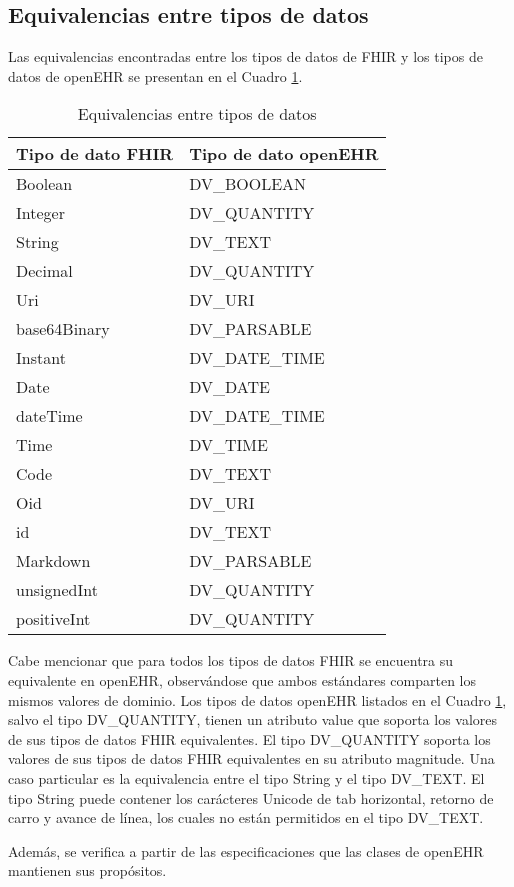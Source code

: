 \subsection{Equivalencias entre tipos de datos}

Las equivalencias encontradas entre los tipos de datos de FHIR y los tipos de datos de openEHR se presentan en el Cuadro \ref{table:equivalents}.

\begin{table}[h]
  \caption{Equivalencias entre tipos de datos}
  \label{table:equivalents}
  \begin{tabular}{l l}
    \hline
    Tipo de dato FHIR &	Tipo de dato openEHR \\
    \hline
    Boolean	& DV\_BOOLEAN \\
    Integer	& DV\_QUANTITY \\
    String	& DV\_TEXT \\
    Decimal	& DV\_QUANTITY \\
    Uri	& DV\_URI \\
    base64Binary	& DV\_PARSABLE \\
    Instant	& DV\_DATE\_TIME \\
    Date	& DV\_DATE \\
    dateTime	& DV\_DATE\_TIME \\
    Time	& DV\_TIME \\
    Code	& DV\_TEXT \\
    Oid	& DV\_URI \\
    id 	& DV\_TEXT \\
    Markdown	& DV\_PARSABLE \\
    unsignedInt	& DV\_QUANTITY \\
    positiveInt	& DV\_QUANTITY \\
    \hline
  \end{tabular}
\end{table}

Cabe mencionar que para todos los tipos de datos FHIR se encuentra su equivalente en openEHR, observándose que ambos estándares comparten los mismos valores de dominio. Los tipos de datos openEHR listados en el Cuadro \ref{table:equivalents}, salvo el tipo DV\_QUANTITY, tienen un atributo value que soporta los valores de sus tipos de datos FHIR equivalentes. El tipo DV\_QUANTITY soporta los valores de sus tipos de datos FHIR equivalentes en su atributo magnitude. Una caso particular es la equivalencia entre el tipo String y el tipo DV\_TEXT. El tipo String puede contener los carácteres Unicode  de tab horizontal, retorno de carro y avance de línea, los cuales no están permitidos en el tipo DV\_TEXT.

Además, se verifica a partir de las especificaciones que las clases de openEHR mantienen sus propósitos.
